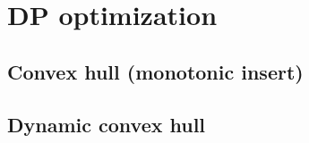 \section{DP optimization}

\subsection{Convex hull (monotonic insert)}


\subsection{Dynamic convex hull}


